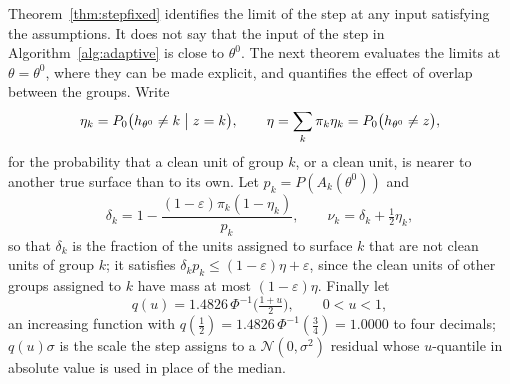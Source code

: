 Theorem~\ref{thm:stepfixed} identifies the limit of the step at any input satisfying the
assumptions. It does not say that the input of the step in Algorithm~\ref{alg:adaptive} is
close to $\theta^{0}$. The next theorem evaluates the limits at $\theta=\theta^{0}$, where they
can be made explicit, and quantifies the effect of overlap between the groups. Write
\[
\eta_k=P_0\bigl(h_{\theta^{0}}\ne k\bigm|z=k\bigr),\qquad
\eta=\sum_k\pi_k\eta_k=P_0\bigl(h_{\theta^{0}}\ne z\bigr),
\]
for the probability that a clean unit of group $k$, or a clean unit, is nearer to another
true surface than to its own. Let $p_k=P(A_k(\theta^{0}))$ and
\[
\delta_k=1-\frac{(1-\varepsilon)\pi_k(1-\eta_k)}{p_k},\qquad \nu_k=\delta_k+\tfrac12\eta_k,
\]
so that $\delta_k$ is the fraction of the units assigned to surface $k$ that are not clean
units of group $k$; it satisfies $\delta_kp_k\le(1-\varepsilon)\eta+\varepsilon$, since the
clean units of other groups assigned to $k$ have mass at most $(1-\varepsilon)\eta$. Finally
let
\[
q(u)=1.4826\,\Phi^{-1}\bigl(\tfrac{1+u}{2}\bigr),\qquad 0<u<1,
\]
an increasing function with $q(\tfrac12)=1.4826\,\Phi^{-1}(\tfrac34)=1.0000$ to four
decimals; $q(u)\sigma$ is the scale the step assigns to a $\mathcal N(0,\sigma^{2})$ residual
whose $u$-quantile in absolute value is used in place of the median.


